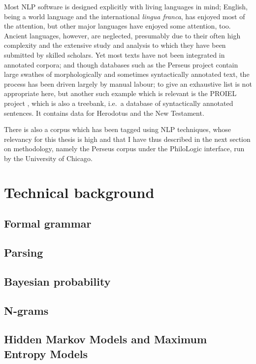 Most NLP software is designed explicitly with living languages in mind;
English, being a world language and the international \textit{lingua franca},
has enjoyed most of the attention, but other major languages have enjoyed some
attention, too. Ancient languages, however, are neglected, presumably due to
their often high complexity and the extensive study and analysis to which they
have been submitted by skilled scholars. Yet most texts have not been
integrated in annotated corpora; and though databases such as the Perseus
project contain large swathes of morphologically and sometimes syntactically
annotated text, the process has been driven largely by manual labour; to give
an exhaustive list is not appropriate here, but another such example which is
relevant is the PROIEL project \citep{proiel}, which is also a treebank, i.e.\ a database of
syntactically annotated sentences. It contains data for Herodotus and the New Testament.

There is also a corpus which has been tagged using NLP techniques, whose
relevancy for this thesis is high and that I have thus described in the next
section on methodology, namely the Perseus corpus under the PhiloLogic
interface, run by the University of Chicago.


\section{Technical background}

\subsection{Formal grammar}
\label{sec:formalgrammar}

\subsection{Parsing}
\label{sec:parsing}

\subsection{Bayesian probability}
\label{sec:bayes}

\subsection{N-grams}
\label{sec:ngrams}

\subsection{Hidden Markov Models and Maximum Entropy Models}
\label{sec:hmm-maxent}

